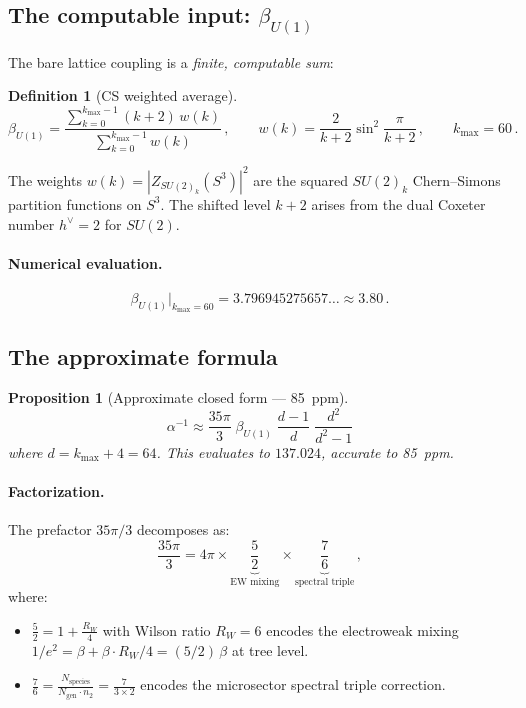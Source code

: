 \documentclass[12pt,a4paper]{article}
\newtheorem{proposition}{Proposition}
\theoremstyle{definition}
\newtheorem{definition}{Definition}
\begin{document}
\subsection{The computable input: $\beta_{U(1)}$}

The bare lattice coupling is a \emph{finite, computable sum}:

\begin{definition}[CS weighted average]
\begin{equation}
\boxed{
\beta_{U(1)} = \frac{\displaystyle\sum_{k=0}^{k_{\max}-1}(k+2)\,w(k)}
     {\displaystyle\sum_{k=0}^{k_{\max}-1}w(k)}\,,
\qquad
w(k) = \frac{2}{k+2}\sin^2\!\frac{\pi}{k+2}\,,
\qquad k_{\max} = 60\,.
}
\end{equation}
\end{definition}

The weights $w(k) = |Z_{SU(2)_k}(S^3)|^2$ are the squared $SU(2)_k$
Chern--Simons partition functions on $S^3$.  The shifted level $k+2$
arises from the dual Coxeter number $h^\vee = 2$ for $SU(2)$.

\paragraph{Numerical evaluation.}
\begin{equation}
\beta_{U(1)}\big|_{k_{\max}=60} = 3.796945275657\ldots \approx 3.80\,.
\end{equation}

\subsection{The approximate formula}

\begin{proposition}[Approximate closed form --- 85~ppm]
\label{prop:approx}
\begin{equation}
\boxed{
\alpha^{-1} \approx \frac{35\pi}{3}\;\beta_{U(1)}\;\frac{d-1}{d}
\;\frac{d^2}{d^2-1}
}
\end{equation}
where $d = k_{\max} + 4 = 64$.  This evaluates to $137.024$, accurate to 85~ppm.
\end{proposition}

\paragraph{Factorization.}
The prefactor $35\pi/3$ decomposes as:
\begin{equation}
\frac{35\pi}{3} = 4\pi \times \underbrace{\frac{5}{2}}_{\text{EW mixing}}
\times \underbrace{\frac{7}{6}}_{\text{spectral triple}}\,,
\end{equation}
where:
\begin{itemize}
\item $\frac{5}{2} = 1 + \frac{R_W}{4}$ with Wilson ratio $R_W = 6$
  encodes the electroweak mixing
  $1/e^2 = \beta + \beta \cdot R_W/4 = (5/2)\,\beta$ at tree level.
\item $\frac{7}{6} = \frac{N_{\mathrm{species}}}{N_{\mathrm{gen}} \cdot n_2}
  = \frac{7}{3 \times 2}$ encodes the microsector spectral triple correction.
\end{itemize}
\end{document}
